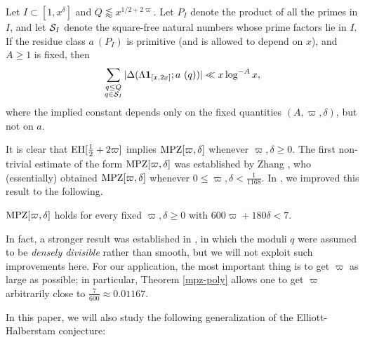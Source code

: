 \begin{claim}\label{mpz-claim} Let $I \subset
  [1,x^\delta]$ and $Q \lessapprox x^{1/2+2\varpi}$.  Let $P_I$ denote the product of all the primes in $I$, and let $\mathcal{S}_I$ denote the square-free natural numbers whose prime factors lie in $I$.  If the residue class $a\ (P_I)$ is
  primitive (and is allowed to depend on $x$), and $A \geq 1$
  is fixed, then
\begin{equation}\label{qq-mpz}
  \sum_{\substack{q \leq Q\\q \in \mathcal{S}_I}} |\Delta(\Lambda \mathbf{1}_{[x,2x]}; a\ (q))| \ll x \log^{-A} x,
\end{equation}
where the implied constant depends only on the fixed quantities $(A,\varpi,\delta)$, but
not on $a$.
\end{claim}

It is clear that $\operatorname*{EH}[\frac{1}{2}+2\varpi]$ implies $\operatorname*{MPZ}[\varpi,\delta]$ whenever $\varpi,\delta \geq 0$.  The first non-trivial estimate of the form $\operatorname*{MPZ}[\varpi,\delta]$ was established by Zhang \cite{zhang}, who (essentially) obtained $\operatorname*{MPZ}[\varpi,\delta]$ whenever $0 \leq \varpi, \delta < \frac{1}{1168}$.
In \cite[Theorem 2.17]{polymath8a}, we improved this result to the following.

\begin{theorem}\label{mpz-poly}  $\operatorname*{MPZ}[\varpi,\delta]$ holds for every fixed $\varpi,\delta \geq 0$ with $600 \varpi + 180 \delta < 7$.
\end{theorem}

In fact, a stronger result was established in \cite{polymath8a}, in which the moduli $q$ were assumed to be \emph{densely divisible} rather than smooth, but we will not exploit such improvements here.  For our application, the most important thing is to get $\varpi$ as large as possible; in particular, Theorem \ref{mpz-poly} allows one to get $\varpi$ arbitrarily close to $\frac{7}{600} \approx 0.01167$. 

%
%

In this paper, we will also study the following generalization of the Elliott-Halberstam conjecture:

